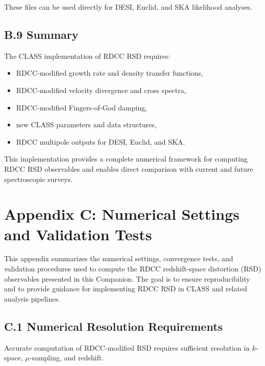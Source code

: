\documentclass[11pt,a4paper]{article}
\begin{document}
These files can be used directly for DESI, Euclid, and SKA likelihood analyses.

\subsection*{B.9 Summary}

The CLASS implementation of RDCC RSD requires:

\begin{itemize}
\item RDCC-modified growth rate and density transfer functions,
\item RDCC-modified velocity divergence and cross spectra,
\item RDCC-modified Fingers-of-God damping,
\item new CLASS parameters and data structures,
\item RDCC multipole outputs for DESI, Euclid, and SKA.
\end{itemize}

This implementation provides a complete numerical framework for computing RDCC RSD
observables and enables direct comparison with current and future spectroscopic surveys.

\section*{Appendix C: Numerical Settings and Validation Tests}

This appendix summarizes the numerical settings, convergence tests, and validation procedures
used to compute the RDCC redshift-space distortion (RSD) observables presented in this
Companion. The goal is to ensure reproducibility and to provide guidance for implementing
RDCC RSD in CLASS and related analysis pipelines.

\subsection*{C.1 Numerical Resolution Requirements}

Accurate computation of RDCC-modified RSD requires sufficient resolution in $k$-space,
$\mu$-sampling, and redshift.
\end{document}
